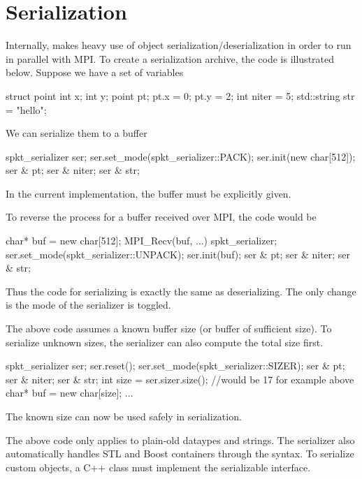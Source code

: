 \section{Serialization}
Internally, \sstmacro makes heavy use of object serialization/deserialization in order to run in parallel with MPI.
To create a serialization archive, the code is illustrated below. Suppose we have a set of variables

\begin{CppCode}
struct point {
 int x;
 int y;
}
point pt;
pt.x = 0;
pt.y = 2;
int niter = 5;
std::string str = "hello";
\end{CppCode}

We can serialize them to a buffer

\begin{CppCode}
spkt_serializer ser;
ser.set_mode(spkt_serializer::PACK);
ser.init(new char[512]);
ser & pt;
ser & niter;
ser & str;
\end{CppCode}
In the current implementation, the buffer must be explicitly given.

To reverse the process for a buffer received over MPI, the code would be

\begin{CppCode}
char* buf = new char[512];
MPI_Recv(buf, ...)
spkt_serializer;
ser.set_mode(spkt_serializer::UNPACK);
ser.init(buf);
ser & pt;
ser & niter;
ser & str;
\end{CppCode}

Thus the code for serializing is exactly the same as deserializing. The only change is the mode of the serializer is toggled.

The above code assumes a known buffer size (or buffer of sufficient size).
To serialize unknown sizes, the serializer can also compute the total size first.

\begin{CppCode}
spkt_serializer ser;
ser.reset();
ser.set_mode(spkt_serializer::SIZER);
ser & pt;
ser & niter;
ser & str;
int size = ser.sizer.size(); //would be 17 for example above
char* buf = new char[size];
...
\end{CppCode}
The known size can now be used safely in serialization.

The above code only applies to plain-old dataypes and strings.
The serializer also automatically handles STL and Boost containers
through the \inlinecode{<<} syntax.
To serialize custom objects, a C++ class must implement the serializable interface.

